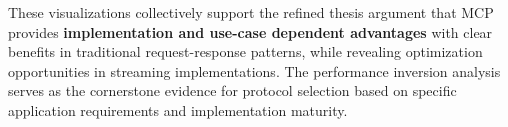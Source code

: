 These visualizations collectively support the refined thesis argument that MCP provides \textbf{implementation and use-case dependent advantages} with clear benefits in traditional request-response patterns, while revealing optimization opportunities in streaming implementations. The performance inversion analysis serves as the cornerstone evidence for protocol selection based on specific application requirements and implementation maturity.
